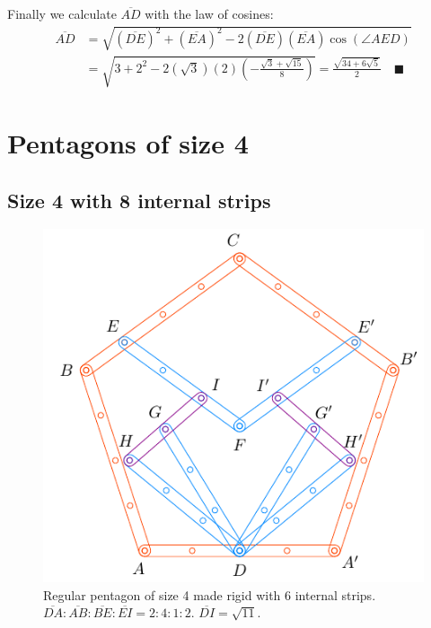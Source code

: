 \documentclass[11pt]{article}
\begin{document}
Finally we calculate $\overline{AD}$ with the law of cosines:
\begin{align}
\overline{AD} &= \sqrt{(\overline{DE})^2 + (\overline{EA})^2 
 - 2(\overline{DE})(\overline{EA})\cos(\angle{AED})} \nonumber\\
 &= \sqrt{3 + 2^2 - 2(\sqrt3)(2)\left(-\frac{\sqrt3 + \sqrt{15}}8\right)} 
 = \frac{\sqrt{34 + 6\sqrt5}}2 \quad\blacksquare
\end{align}


\section{Pentagons of size 4}

\subsection{Size 4 with 8 internal strips}

\begin{figure}[H]
\centering
\includegraphics[scale=1.1]{4/penta4-8a}
\caption{Regular pentagon of size 4 made rigid with 6 internal strips. $\overline{DA} : \overline{AB} : \overline{BE} : \overline{EI} = 2:4:1:2$. $\overline{DI} = \sqrt{11}$.}
\label{fig:penta4-8a}
\end{figure}
\end{document}
